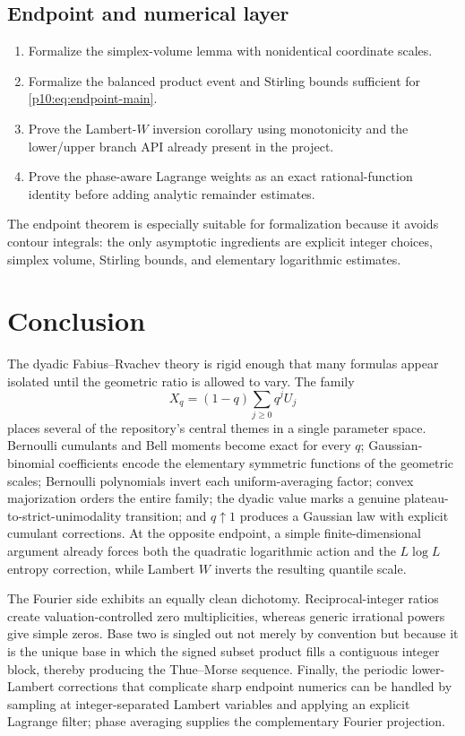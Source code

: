 \documentclass[11pt]{article}
\numberwithin{equation}{section}
\theoremstyle{definition}
\theoremstyle{remark}
\begin{document}
\subsection{Endpoint and numerical layer}

\begin{enumerate}
\item Formalize the simplex-volume lemma with nonidentical coordinate scales.
\item Formalize the balanced product event and Stirling bounds sufficient for
      \eqref{p10:eq:endpoint-main}.
\item Prove the Lambert-$W$ inversion corollary using monotonicity and the lower/upper branch
      API already present in the project.
\item Prove the phase-aware Lagrange weights as an exact rational-function identity before
      adding analytic remainder estimates.
\end{enumerate}

The endpoint theorem is especially suitable for formalization because it avoids contour
integrals: the only asymptotic ingredients are explicit integer choices, simplex volume,
Stirling bounds, and elementary logarithmic estimates.

\section{Conclusion}
\label{p10:sec:conclusion}

The dyadic Fabius--Rvachev theory is rigid enough that many formulas appear isolated until the
geometric ratio is allowed to vary.  The family
\[
 X_q=(1-q)\sum_{j\ge0}q^jU_j
\]
places several of the repository's central themes in a single parameter space.
Bernoulli cumulants and Bell moments become exact for every $q$; Gaussian-binomial
coefficients encode the elementary symmetric functions of the geometric scales; Bernoulli
polynomials invert each uniform-averaging factor; convex majorization orders the entire
family; the dyadic value marks a genuine plateau-to-strict-unimodality transition; and
$q\uparrow1$ produces a Gaussian law with explicit cumulant corrections.  At the opposite
endpoint, a simple finite-dimensional argument already forces both the quadratic logarithmic
action and the $L\log L$ entropy correction, while Lambert $W$ inverts the resulting quantile
scale.

The Fourier side exhibits an equally clean dichotomy.  Reciprocal-integer ratios create
valuation-controlled zero multiplicities, whereas generic irrational powers give simple
zeros.  Base two is singled out not merely by convention but because it is the unique base in
which the signed subset product fills a contiguous integer block, thereby producing the
Thue--Morse sequence.  Finally, the periodic lower-Lambert corrections that complicate sharp
endpoint numerics can be handled by sampling at integer-separated Lambert variables and
applying an explicit Lagrange filter; phase averaging supplies the complementary Fourier
projection.
\end{document}

